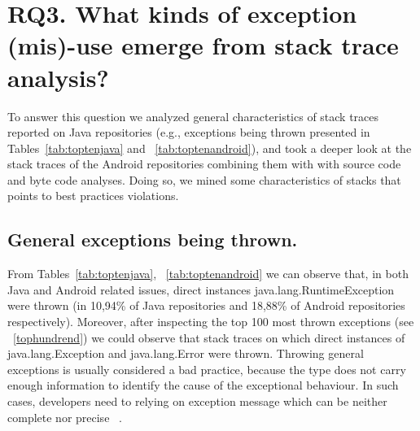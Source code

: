 \documentclass[conference]{IEEEtran}
\begin{document}




\section{RQ3.  What kinds of exception (mis)-use emerge from stack trace analysis? }

To answer this question we analyzed general characteristics of stack traces
reported on Java repositories (e.g., exceptions being thrown presented in
Tables~\ref{tab:toptenjava} and ~\ref{tab:toptenandroid}), and took a deeper
look at the stack traces of the Android repositories combining them with with
source code and byte code analyses. Doing so, we mined some characteristics of
stacks that points to best practices violations.

\subsection{General exceptions being thrown.}

From Tables~\ref{tab:toptenjava}, ~\ref{tab:toptenandroid} we can observe that,
in both Java and Android related issues, direct instances
java.lang.RuntimeException were thrown  (in 10,94\% of Java repositories and
18,88\% of Android repositories respectively). Moreover, after inspecting the
top 100 most thrown exceptions (see ~\ref{tophundrend}) we could observe that
stack traces on which direct instances of java.lang.Exception and
java.lang.Error were thrown. Throwing general exceptions is usually considered a
bad practice, because the type does not carry enough information to identify the
cause of the exceptional behaviour. In such cases, developers need to relying on
exception message which can be neither complete nor precise
~\cite{gosling2000java}.
\end{document}
